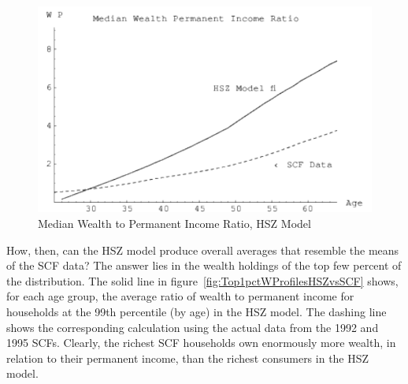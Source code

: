 \documentclass[titlepage,12pt]{article}
\begin{document}
\hypertarget{MedianWProfilesHSZvsSCF}{}
\begin{figure}
	\centerline{\includegraphics{./Figures/MedianWProfilesHSZvsSCF}}
	\caption{Median Wealth to Permanent Income Ratio, HSZ Model}
	\label{fig:MedianWProfilesHSZvsSCF}
\end{figure}


How, then, can the HSZ model produce overall averages that resemble 
the means of the SCF data?  The answer lies in the wealth holdings of 
the top few percent of the distribution.  The solid line in 
figure~\ref{fig:Top1pctWProfilesHSZvsSCF} shows, for each age group, 
the average ratio of wealth to permanent income for households at the 
99th percentile (by age) in the HSZ model.  The dashing line shows the 
corresponding calculation using the actual data from the 1992 and 1995 
SCFs.  Clearly, the richest SCF households own enormously more wealth, 
in relation to their permanent income, than the richest consumers in 
the HSZ model.

\hypertarget{Top1pctWProfilesHSZvsSCF}{}
\end{document}
